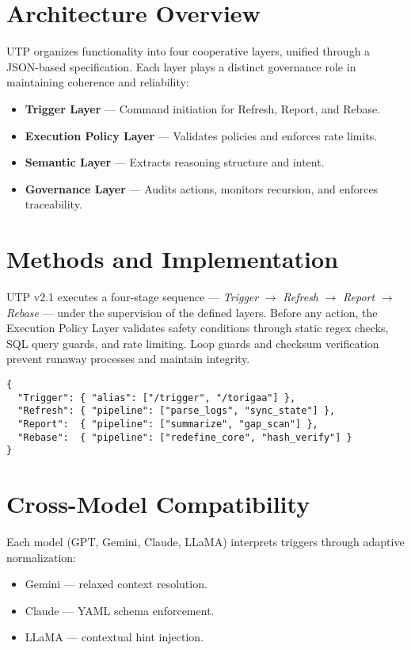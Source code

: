 \documentclass[conference]{IEEEtran}
\begin{document}
\section{Architecture Overview}
UTP organizes functionality into four cooperative layers, unified through a JSON-based specification.
Each layer plays a distinct governance role in maintaining coherence and reliability:
\begin{itemize}
\item \textbf{Trigger Layer} — Command initiation for Refresh, Report, and Rebase.
\item \textbf{Execution Policy Layer} — Validates policies and enforces rate limits.
\item \textbf{Semantic Layer} — Extracts reasoning structure and intent.
\item \textbf{Governance Layer} — Audits actions, monitors recursion, and enforces traceability.
\end{itemize}

\section{Methods and Implementation}
UTP v2.1 executes a four-stage sequence — \textit{Trigger} $\rightarrow$ \textit{Refresh} $\rightarrow$ \textit{Report} $\rightarrow$ \textit{Rebase} — under the supervision of the defined layers.
Before any action, the Execution Policy Layer validates safety conditions through static regex checks, SQL query guards, and rate limiting.
Loop guards and checksum verification prevent runaway processes and maintain integrity.

\begin{verbatim}
{
  "Trigger": { "alias": ["/trigger", "/torigaa"] },
  "Refresh": { "pipeline": ["parse_logs", "sync_state"] },
  "Report":  { "pipeline": ["summarize", "gap_scan"] },
  "Rebase":  { "pipeline": ["redefine_core", "hash_verify"] }
}
\end{verbatim}

\section{Cross-Model Compatibility}
Each model (GPT, Gemini, Claude, LLaMA) interprets triggers through adaptive normalization:
\begin{itemize}
\item Gemini --- relaxed context resolution.
\item Claude --- YAML schema enforcement.
\item LLaMA --- contextual hint injection.
\end{itemize}
\end{document}
